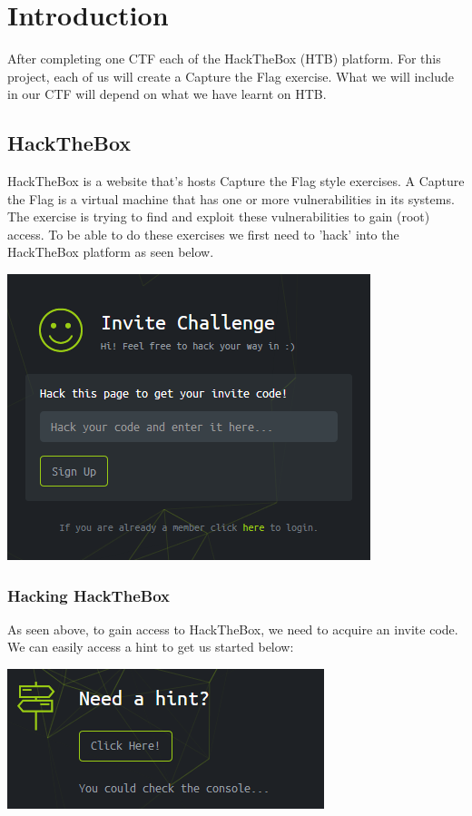 \documentclass[../main.tex]{subfiles}
\begin{document}
\section{Introduction}

After completing one CTF each of the HackTheBox (HTB) platform. For this project, each of us will create a Capture the Flag exercise. What we will include in our CTF will depend on what we have learnt on HTB. 

\subsection{HackTheBox}

HackTheBox is a website that's hosts Capture the Flag style exercises. A Capture the Flag is a virtual machine that has one or more vulnerabilities in its systems. The exercise is trying to find and exploit these vulnerabilities to gain (root) access. To be able to do these exercises we first need to 'hack' into the HackTheBox platform as seen below.

\begin{center}
  \includegraphics[width=0.5\linewidth]{images/hackthebox_login.png}
\end{center}
 
\subsubsection{Hacking HackTheBox}

As seen above, to gain access to HackTheBox, we need to acquire an invite code. We can easily access a hint to get us started below:

\begin{center}
  \includegraphics[width=0.5\linewidth]{images/hackthebox_hint.png}
\end{center}
\end{document}
